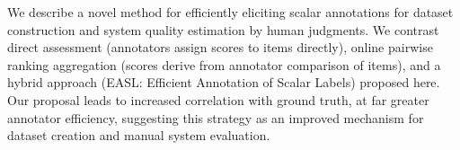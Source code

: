 We describe a novel method for efficiently eliciting scalar annotations for dataset construction and system quality estimation by human judgments. We contrast direct assessment (annotators assign scores to items directly), online pairwise ranking aggregation (scores derive from annotator comparison of items), and a hybrid approach (EASL: Efficient Annotation of Scalar Labels) proposed here. Our proposal leads to increased correlation with ground truth, at far greater annotator efficiency, suggesting this strategy as an improved mechanism for dataset creation and manual system evaluation.
